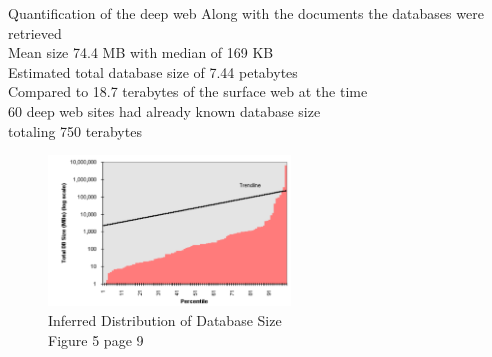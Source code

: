 \documentclass{beamer}
\begin{document}
\begin{frame}[fragile]{Quantification of the deep web}
Along with the documents the databases were retrieved \\
Mean size 74.4 MB with median of 169 KB \\
Estimated total database size of 7.44 petabytes \\
Compared to 18.7 terabytes of the surface web at the time \\
60 deep web sites had already known database size \\
totaling 750 terabytes \\
\begin{figure}
\begin{minipage}[c]{0.3\textwidth}
   \caption{\footnotesize{Inferred Distribution of Database  Size} \\ Figure 5 page 9}
  \end{minipage}
			\begin{minipage}[c]{0.67\textwidth}
  \includegraphics[height=4cm]{tdbSize.png}
  \end{minipage}
			
	\end{figure}

\end{frame}
\end{document}
